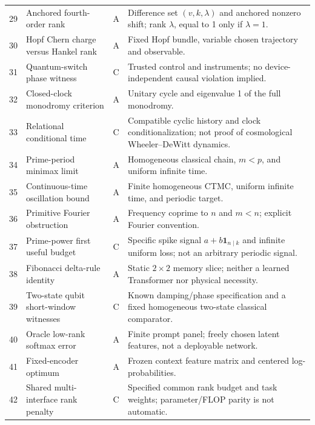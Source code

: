 \documentclass[11pt,a4paper,oneside]{book}
\newcommand{\one}{\mathbf 1}\newcommand{\ii}{\mathrm i}\newcommand{\dd}{\mathrm d}
\begin{document}
\begin{longtable}{p{}p{}p{}p{}}
29&Anchored fourth-order rank&A&Difference set $(v,k,\lambda)$ and anchored nonzero shift; rank $\lambda$, equal to 1 only if $\lambda=1$.\\
30&Hopf Chern charge versus Hankel rank&A&Fixed Hopf bundle, variable chosen trajectory and observable.\\
31&Quantum-switch phase witness&C&Trusted control and instruments; no device-independent causal violation implied.\\
32&Closed-clock monodromy criterion&A&Unitary cycle and eigenvalue 1 of the full monodromy.\\
33&Relational conditional time&C&Compatible cyclic history and clock conditionalization; not proof of cosmological Wheeler--DeWitt dynamics.\\
34&Prime-period minimax limit&A&Homogeneous classical chain, $m<p$, and uniform infinite time.\\
35&Continuous-time oscillation bound&A&Finite homogeneous CTMC, uniform infinite time, and periodic target.\\
36&Primitive Fourier obstruction&A&Frequency coprime to $n$ and $m<n$; explicit Fourier convention.\\
37&Prime-power first useful budget&C&Specific spike signal $a+b\one_{n\mid k}$ and infinite uniform loss; not an arbitrary periodic signal.\\
38&Fibonacci delta-rule identity&A&Static $2\times2$ memory slice; neither a learned Transformer nor physical necessity.\\
39&Two-state qubit short-window witnesses&C&Known damping/phase specification and a fixed homogeneous two-state classical comparator.\\
40&Oracle low-rank softmax error&A&Finite prompt panel; freely chosen latent features, not a deployable network.\\
41&Fixed-encoder optimum&A&Frozen context feature matrix and centered log-probabilities.\\
42&Shared multi-interface rank penalty&C&Specified common rank budget and task weights; parameter/FLOP parity is not automatic.\\\bottomrule
\end{longtable}\endgroup
\end{document}
